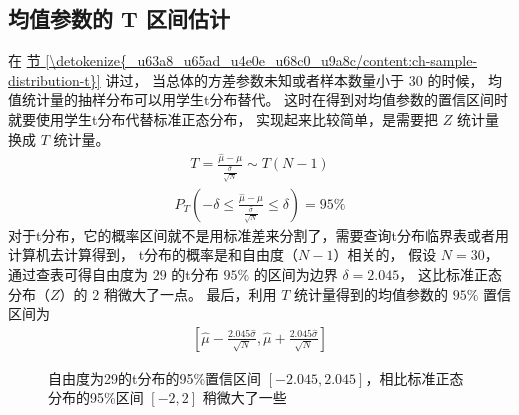 \documentclass[letterpaper,10pt,english]{sphinxmanual}
\begin{document}
\subsection{均值参数的 T 区间估计}
\label{\detokenize{_u63a8_u65ad_u4e0e_u68c0_u9a8c/content:id18}}
在 \hyperref[\detokenize{_u63a8_u65ad_u4e0e_u68c0_u9a8c/content:ch-sample-distribution-t}]{节 \ref{\detokenize{_u63a8_u65ad_u4e0e_u68c0_u9a8c/content:ch-sample-distribution-t}}} 讲过，
当总体的方差参数未知或者样本数量小于 \(30\) 的时候，
均值统计量的抽样分布可以用学生t分布替代。
这时在得到对均值参数的置信区间时就要使用学生t分布代替标准正态分布，
实现起来比较简单，是需要把 \(Z\) 统计量换成 \(T\) 统计量。
\begin{equation}\label{equation:推断与检验/content:eq_estimator_eval_090}
\begin{split}T = \frac{\hat{\mu} - \mu}{ \frac{ \hat{\sigma}}{\sqrt{N}}  } \sim T(N-1)\end{split}
\end{equation}\begin{equation}\label{equation:推断与检验/content:推断与检验/content:80}
\begin{split}P_{T}( -\delta \leq \frac{\hat{\mu} - \mu}{ \frac{\hat{\sigma}}{\sqrt{N}}} \leq \delta ) = 95\%\end{split}
\end{equation}
对于t分布，它的概率区间就不是用标准差来分割了，需要查询t分布临界表或者用计算机去计算得到，
t分布的概率是和自由度（\(N-1\)）相关的，
假设 \(N=30\)，通过查表可得自由度为 \(29\) 的t分布 \(95\%\) 的区间为边界
\(\delta=2.045\)，
这比标准正态分布（\(Z\)）的 \(2\) 稍微大了一点。
最后，利用 \(T\) 统计量得到的均值参数的 \(95\%\) 置信区间为
\begin{equation}\label{equation:推断与检验/content:推断与检验/content:81}
\begin{split}\left [ \hat{\mu} - \frac{2.045 \hat{\sigma}}{\sqrt{N}} ,\hat{\mu} + \frac{2.045 \hat{\sigma} }{\sqrt{N}} \right ]\end{split}
\end{equation}
\begin{figure}[htbp]
\centering
\capstart

\noindent{}
\caption{自由度为29的t分布的95\%置信区间 \([-2.045,2.045]\)，相比标准正态分布的95\%区间 \([-2,2]\) 稍微大了一些}\label{\detokenize{_u63a8_u65ad_u4e0e_u68c0_u9a8c/content:id28}}\label{\detokenize{_u63a8_u65ad_u4e0e_u68c0_u9a8c/content:fg-influence-t}}\end{figure}
\end{document}
